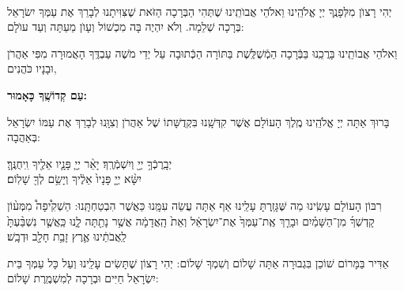 \documentclass[twoside, openany, parskip=half, 11pt]{book}
\begin{document}
\retzeh

\yaalehveyavo

\zion

\modim

\clearpage

\alhanisim

\weekdaysahodos

\clearpage
\begin{sometimes}


\begin{paracol}{2}
\\
יְהִי רָצוׂן מִלְּפָנֶֽךָ יְיָ אֱלֹהֵֽינוּ וֵאלֹהֵי אֲבוׂתֵֽינוּ שֶׁתְּהִי הַבְּרָכָה הַזֹּאת שֶׁצִּוִּיתָנוּ לְבָרֵךְ אֶת עַמְּךָ יִשׂרָאֵל בְּרָכָה שְׁלֵמָה. וְלֹא יִהְיֶה בָּה מִכְשׁוֹל וְעָוׂן מֵעַתָּה וְעַד עוׂלָם:

\switchcolumn

\shatz {}
וֵאלֹהֵי אֲבוֹתֵֽינוּ בָּרֲכֵֽנוּ בַּבְּֿרָכָה הַמְֿשֻׁלֶּֽשֶׁת בַּתּוֹרָה הַכְּֿתוּבָה עַל יְדֵי מֹשֶׁה עַבְדֶּֽךָ הָאֲמוּרָה מִפִּי אַהֲרֹן וּבָנָיו כֹּהֲנִים,
 
\textbf{עַם קְדוֹשֶֽׁךָ כָּאָמוּר:}
\end{paracol}

בָּרוּךְ אַתָּה יְיָ אֱלֹהֵֽינוּ מֶֽלֶךְ הָעוֹלָם אֲשֶׁר קִדְּשָֽׁנוּ בִּקְדֻשָּׁתוֹ שֶׁל אַהֲרֹן  וְצִוָּֽנוּ לְבָרֵךְ אֶת עַמּוֹ יִשְׂרָאֵל בְּאַהֲבָה:

יְבָֽרֶכְֿךָ֥  יְיָ֖ וְיִשְׁמְֿרֶֽךָ׃ \quad יָאֵ֨ר יְיָ֧ פָּנָ֛יו אֵלֶ֖יךָ וִֽיחֻנֶּֽךָּ׃\\ יִשָּׂ֨א יְיָ֤ פָּנָיו֙ אֵלֶ֔יךָ וְיָשֵׂ֥ם לְךָ֖ שָׁלֽוֹם׃ 

\begin{paracol}{2}
רִבּוֹן הָעוֹלָם עָשִֽׂינוּ מַה שֶּׁגָּזַֽרְתָּ עָלֵֽינוּ אַף אַתָּה עֲשֵׂה עִמָּֽנוּ כַּאֲשֶׁר הִבְטַחְתָּֽנוּ:  הַשְׁקִ֩יפָה֩ מִמְּע֨וֹן קָדְשְׁךָ֜ מִן־הַשָּׁמַ֗יִם וּבָרֵ֤ךְ אֶֽת־עַמְּךָ֙ אֶת־יִשְׂרָאֵ֔ל וְאֵת֙ הָֽאֲדָמָ֔ה אֲשֶׁ֥ר נָתַ֖תָּה לָ֑נוּ כַּֽאֲשֶׁ֤ר נִשְׁבַּ֨עְתָּ֙ לַֽאֲבֹתֵ֔ינוּ אֶ֛רֶץ זָבַ֥ת חָלָ֖ב וּדְבָֽשׁ׃

\switchcolumn

\kahal
אַדִּיר בַּמָּרוֹם שׁוֹכֵן בִּגְבוּרָה אַתָּה שָׁלוֹם וְשִׁמְךָ שָׁלוֹם: יְהִי רָצוֹן שֶׁתָּשִׂים עָלֵֽינוּ וְעַל כָּל עַמְּךָ בֵּית יִשְׂרָאֵל חַיִּים וּבְרָכָה לְמִשְׁמֶֽרֶת שָׁלוֹם:
\end{paracol}


\end{sometimes}
\end{document}
